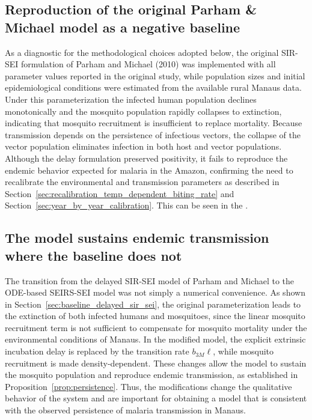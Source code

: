 \documentclass[a4paper,fleqn]{cas-dc}
\begin{document}
\subsection{Reproduction of the original Parham \& Michael model as a negative baseline}
\label{sec:results_parham_michael}
As a diagnostic for the methodological choices adopted below, the original SIR-SEI formulation of Parham and Michael (2010) \cite{Parham2010} was implemented with all parameter values reported in the original study, while population sizes and initial epidemiological conditions were estimated from the available rural Manaus data. Under this parameterization the infected human population declines monotonically and the mosquito population rapidly collapses to extinction, indicating that mosquito recruitment is insufficient to replace mortality. Because transmission depends on the persistence of infectious vectors, the collapse of the vector population eliminates infection in both host and vector populations. Although the delay formulation preserved positivity, it fails to reproduce the endemic behavior expected for malaria in the Amazon, confirming the need to recalibrate the environmental and transmission parameters as described in Section~\ref{sec:recalibration_temp_dependent_biting_rate} and Section~\ref{sec:year_by_year_calibration}. This can be seen in the .


\subsection{The model sustains endemic transmission where the baseline does not}
\label{sec:baseline_doesnt_sustain_transmission}
The transition from the delayed SIR-SEI model of Parham and Michael to the ODE-based SEIRS-SEI model was not simply a numerical convenience. As shown in Section~\ref{sec:baseline_delayed_sir_sei}, the original parameterization leads to the extinction of both infected humans and mosquitoes, since the linear mosquito recruitment term is not sufficient to compensate for mosquito mortality under the environmental conditions of Manaus. In the modified model, the explicit extrinsic incubation delay is replaced by the transition rate $b_{3M}\ell$, while mosquito recruitment is made density-dependent. These changes allow the model to sustain the mosquito population and reproduce endemic transmission, as established in Proposition~\ref{prop:persistence}. Thus, the modifications change the qualitative behavior of the system and are important for obtaining a model that is consistent with the observed persistence of malaria transmission in Manaus.
\end{document}
